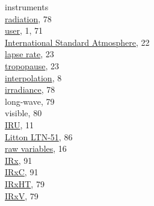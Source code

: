 \documentclass[
  english,
]{book}
\begin{document}
instruments\\
\hspace*{0.333em}\hspace*{0.333em}\href{./8-radiation-variables.html}{radiation},
78\\
\hspace*{0.333em}\hspace*{0.333em}\href{./6-air-chemistry-measurements.html\#awas-cims-qcls-toga}{user},
1, 71\\
\href{./3-the-state-of-the-aircraft.html\#palt}{International Standard
Atmosphere}, 22\\
\hspace*{0.333em}\hspace*{0.333em}\href{./3-the-state-of-the-aircraft.html\#palt}{lapse
rate}, 23\\
\hspace*{0.333em}\hspace*{0.333em}\href{./3-the-state-of-the-aircraft.html\#palt}{tropopause},
23\\
\href{./2-general-information-about-data-files.html\#synchronization-of-measurements}{interpolation},
8\\
\href{./8-radiation-measurements.html\#measurements-of-irradiance-and-radiometric-temperature}{irradiance},
78\\
\hspace*{0.333em}\hspace*{0.333em}long-wave, 79\\
\hspace*{0.333em}\hspace*{0.333em}visible, 80\\
\href{./3-the-state-of-the-aircraft.html\#inertial-reference-systems}{IRU},
11\\
\hspace*{0.333em}\hspace*{0.333em}\href{./10-obsolete-variables.html\#ltn51}{Litton
LTN-51}, 86\\
\hspace*{0.333em}\hspace*{0.333em}\href{./3-the-state-of-the-aircraft\#special-use-irs}{raw
variables}, 16\\
\href{./10-obsolete-variables.html\#irx}{IRx}, 91\\
\href{./8-radiation-variables.html\#irxc}{IRxC}, 91\\
\href{./8-radiation-variables.html\#irxht}{IRxHT}, 79\\
\href{./7-aerosol-particle-measurements.html\#trstx}{IRxV}, 79\\
\end{document}
